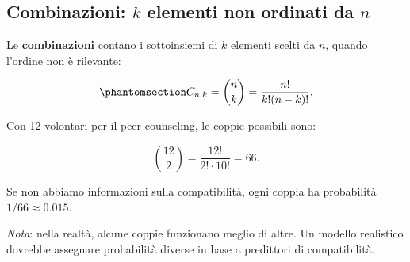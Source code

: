 \documentclass[
  italian,
  letterpaper,
  a4paper,
  11pt,
  open=any]{scrbook}
\theoremstyle{plain}
\theoremstyle{definition}
\theoremstyle{definition}
\theoremstyle{remark}
\begin{document}
\subsection{\texorpdfstring{Combinazioni: \(k\) elementi non ordinati da
\(n\)}{Combinazioni: k elementi non ordinati da n}}\label{combinazioni-k-elementi-non-ordinati-da-n}

Le \textbf{combinazioni} contano i sottoinsiemi di \(k\) elementi scelti
da \(n\), quando l'ordine non è rilevante:

\begin{equation}\protect\phantomsection\label{eq-combinations-def}{
C_{n,k} = \binom{n}{k} = \frac{n!}{k!(n-k)!}.
}\end{equation}

\begin{tcolorbox}[enhanced jigsaw, arc=.35mm, bottomrule=.15mm, bottomtitle=1mm, breakable, colback=white, colbacktitle=quarto-callout-note-color!10!white, colframe=quarto-callout-note-color-frame, coltitle=black, left=2mm, leftrule=.75mm, opacityback=0, opacitybacktitle=0.6, rightrule=.15mm, title=\textcolor{quarto-callout-note-color}{\faInfo}\hspace{0.5em}{Esempio psicologico}, titlerule=0mm, toprule=.15mm, toptitle=1mm]

Con 12 volontari per il peer counseling, le coppie possibili sono:

\[
\binom{12}{2} = \frac{12!}{2! \cdot 10!} = 66.
\]

Se non abbiamo informazioni sulla compatibilità, ogni coppia ha
probabilità \(1/66 \approx 0.015\).

\emph{Nota}: nella realtà, alcune coppie funzionano meglio di altre. Un
modello realistico dovrebbe assegnare probabilità diverse in base a
predittori di compatibilità.

\end{tcolorbox}
\end{document}
